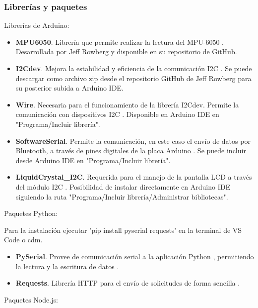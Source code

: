 \subsubsection{Librerías y paquetes}
Librerías de Arduino:
\begin{itemize}
    \item \textbf{MPU6050}. Librería que permite realizar la lectura del MPU-6050 \cite{MPU605015:online}. Desarrollada por Jeff Rowberg y disponible en su repositorio de GitHub.
    \item \textbf{I2Cdev}. Mejora la estabilidad y eficiencia de la comunicación I2C \cite{MPU605015:online}. Se puede descargar como archivo zip desde el repositorio GitHub de Jeff Rowberg para su posterior subida a Arduino IDE.
    \item \textbf{Wire}. Necesaria para el funcionamiento de la librería I2Cdev. Permite la comunicación con dispositivos I2C \cite{WireArdu98:online}. Disponible en Arduino IDE en "Programa/Incluir librería".
    \item \textbf{SoftwareSerial}. Permite la comunicación, en este caso el envío de datos por Bluetooth, a través de pines digitales de la placa Arduino \cite{Software57:online}. Se puede incluir desde Arduino IDE en "Programa/Incluir librería".
    \item \textbf{LiquidCrystal\_I2C}. Requerida para el manejo de la pantalla LCD a través del módulo I2C \cite{LiquidCr9:online}. Posibilidad de instalar directamente en Arduino IDE siguiendo la ruta "Programa/Incluir librería/Administrar bibliotecas".
\end{itemize}

Paquetes Python:

Para la instalación ejecutar 'pip install pyserial requests' en la terminal de VS Code o cdm.
\begin{itemize}
    \item \textbf{PySerial}. Provee de comunicación serial a la aplicación Python , permitiendo la lectura y la escritura de datos \cite{pyserial96:online}.
    \item \textbf{Requests}. Librería HTTP para el envío de solicitudes de forma sencilla \cite{psfreque89:online}.
\end{itemize}

Paquetes Node.js:


